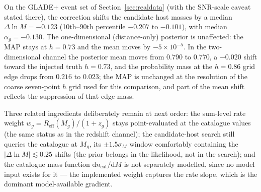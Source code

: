 On the GLADE+ event set of Section~\ref{sec:realdata} (with the SNR-scale caveat stated
there), the correction shifts the candidate host masses by a median
$\Delta\ln M = -0.123$ (10th--90th percentile $-0.207$ to $-0.101$), with median
$\alpha_g = -0.130$. %
The one-dimensional (distance-only) posterior is unaffected: the MAP stays at $h=0.73$ and
the mean moves by $-5\times10^{-5}$. %
In the two-dimensional channel the posterior mean moves from $0.790$ to $0.770$, a $-0.020$
shift toward the injected truth $h = 0.73$, and the probability mass at the $h = 0.86$ grid
edge drops from $0.216$ to $0.023$; the MAP is unchanged at the resolution of the coarse
seven-point $h$ grid used for this comparison, and part of the mean shift reflects the
suppression of that edge mass. %

Three related ingredients deliberately remain at next order: the sum-level rate weight
$w_g = R_{\mathrm{eff}}(M_g)/(1+z_g)$ stays point-evaluated at the catalogue values (the same
status as in the redshift channel); the candidate-host search still queries the catalogue at
$M_g$, its $\pm1.5\sigma_M$ window comfortably containing the $|\Delta\ln M| \lesssim 0.25$
shifts (the prior belongs in the likelihood, not in the search); %
and the catalogue mass function $\mathrm{d}n_{\mathrm{cat}}/\mathrm{d}M$ is not separately
modelled, since no model input exists for it --- the implemented weight captures the rate
slope, which is the dominant model-available gradient.
